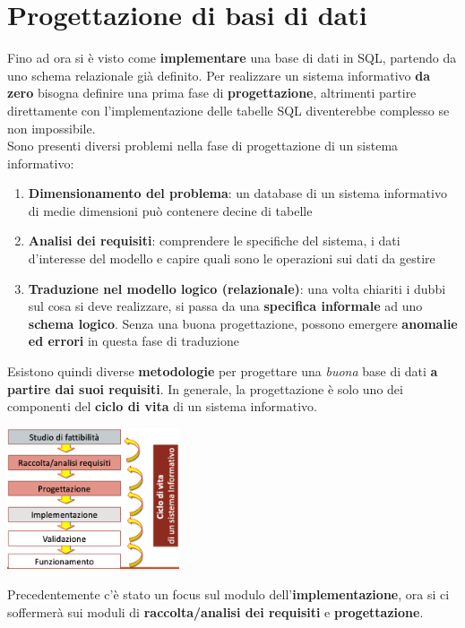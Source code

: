 \documentclass{article}
\begin{document}
\pagestyle{empty}

\section*{Progettazione di basi di dati} 
\large

Fino ad ora si è visto come \textbf{implementare} una base di dati in SQL, partendo da uno schema relazionale già definito. Per realizzare un sistema informativo \textbf{da zero} bisogna definire una prima fase di \textbf{progettazione}, altrimenti partire direttamente con l'implementazione delle tabelle SQL diventerebbe complesso se non impossibile.\\
Sono presenti diversi problemi nella fase di progettazione di un sistema informativo:
\begin{enumerate}[leftmargin=1cm]
    \itemsep0em
    \item \textbf{Dimensionamento del problema}: un database di un sistema informativo di medie dimensioni può contenere decine di tabelle
    \item \textbf{Analisi dei requisiti}: comprendere le specifiche del sistema, i dati d'interesse del modello e capire quali sono le operazioni sui dati da gestire
    \item \textbf{Traduzione nel modello logico (relazionale)}: una volta chiariti i dubbi sul cosa si deve realizzare, si passa da una \textbf{specifica informale} ad uno \textbf{schema logico}. Senza una buona progettazione, possono emergere \textbf{anomalie ed errori} in questa fase di traduzione
\end{enumerate}
Esistono quindi diverse \textbf{metodologie} per progettare una \textit{buona} base di dati \textbf{a partire dai suoi requisiti}. In generale, la progettazione è solo uno dei componenti del \textbf{ciclo di vita} di un sistema informativo.
\begin{center}
    \includegraphics[width=0.38\textwidth]{foto 1.png}
\end{center}
Precedentemente c'è stato un focus sul modulo dell'\textbf{implementazione}, ora si ci soffermerà sui moduli di \textbf{raccolta/analisi dei requisiti} e \textbf{progettazione}.\vspace*{14pt}\\
\end{document}
